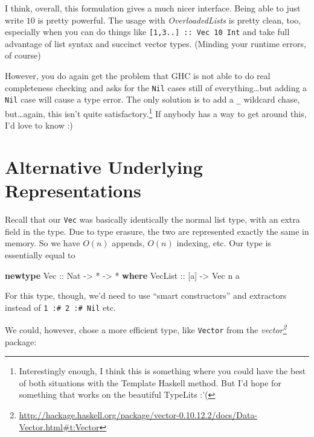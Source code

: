 \documentclass[]{article}
\newenvironment{Shaded}{}{}
\newcommand{\DataTypeTok}[1]{\textcolor[rgb]{0.56,0.13,0.00}{#1}}
\newcommand{\KeywordTok}[1]{\textcolor[rgb]{0.00,0.44,0.13}{\textbf{#1}}}
\newcommand{\NormalTok}[1]{#1}
\newcommand{\OperatorTok}[1]{\textcolor[rgb]{0.40,0.40,0.40}{#1}}
\newcommand{\OtherTok}[1]{\textcolor[rgb]{0.00,0.44,0.13}{#1}}
\renewcommand{\href}[2]{#2\footnote{\url{#1}}}
\begin{document}
I think, overall, this formulation gives a much nicer interface. Being able to
just write \(10\) is pretty powerful. The usage with \emph{OverloadedLists} is
pretty clean, too, especially when you can do things like
\texttt{{[}1,3..{]}\ ::\ Vec\ 10\ Int} and take full advantage of list syntax
and succinct vector types. (Minding your runtime errors, of course)

However, you do again get the problem that GHC is not able to do real
completeness checking and asks for the \texttt{Nil} cases still of
everything\ldots but adding a \texttt{Nil} case will cause a type error. The
only solution is to add a \texttt{\_} wildcard chase, but\ldots again, this
isn't quite satisfactory.\footnote{Interestingly enough, I think this is
  something where you could have the best of both situations with the Template
  Haskell method. But I'd hope for something that works on the beautiful
  TypeLits :'(} If anybody has a way to get around this, I'd love to know :)

\section{Alternative Underlying
Representations}\label{alternative-underlying-representations}

Recall that our \texttt{Vec} was basically identically the normal list type,
with an extra field in the type. Due to type erasure, the two are represented
exactly the same in memory. So we have \(O(n)\) appends, \(O(n)\) indexing, etc.
Our type is essentially equal to

\begin{Shaded}
\begin{Highlighting}[]
\KeywordTok{newtype} \DataTypeTok{Vec}\OtherTok{ ::} \DataTypeTok{Nat} \OtherTok{{-}\textgreater{}} \OperatorTok{*} \OtherTok{{-}\textgreater{}} \OperatorTok{*} \KeywordTok{where}
    \DataTypeTok{VecList}\OtherTok{ ::}\NormalTok{ [a] }\OtherTok{{-}\textgreater{}} \DataTypeTok{Vec}\NormalTok{ n a}
\end{Highlighting}
\end{Shaded}

For this type, though, we'd need to use ``smart constructors'' and extractors
instead of \texttt{1\ :\#\ 2\ :\#\ Nil} etc.

We could, however, chose a more efficient type, like \texttt{Vector} from the
\emph{\href{http://hackage.haskell.org/package/vector-0.10.12.2/docs/Data-Vector.html\#t:Vector}{vector}}
package:
\end{document}
